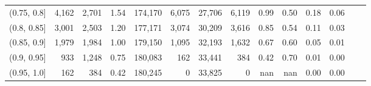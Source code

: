 \begin{tabular}{rrrrrrrrrrrrrr}
(0.75, 0.8]    &   4,162 &  2,701 &   1.54 &  174,170 &    6,075 &  27,706 &   6,119 &  0.99 &  0.50 &  0.18 &      0.06 \\
(0.8, 0.85]    &   3,001 &  2,503 &   1.20 &  177,171 &    3,074 &  30,209 &   3,616 &  0.85 &  0.54 &  0.11 &      0.03 \\
(0.85, 0.9]    &   1,979 &  1,984 &   1.00 &  179,150 &    1,095 &  32,193 &   1,632 &  0.67 &  0.60 &  0.05 &      0.01 \\
(0.9, 0.95]    &     933 &  1,248 &   0.75 &  180,083 &      162 &  33,441 &     384 &  0.42 &  0.70 &  0.01 &      0.00 \\
(0.95, 1.0]    &     162 &    384 &   0.42 &  180,245 &        0 &  33,825 &       0 &   nan &   nan &  0.00 &      0.00 \\
\bottomrule
\end{tabular}
